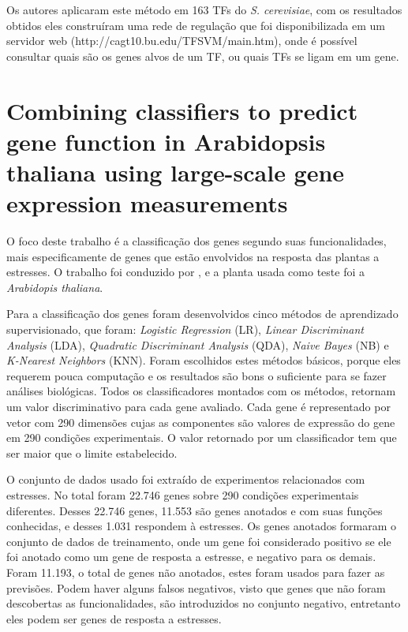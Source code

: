 Os autores aplicaram este método em 163 TFs do \textit{S. cerevisiae}, com os resultados obtidos eles construíram uma rede de regulação que foi disponibilizada em um servidor web (http://cagt10.bu.edu/TFSVM/main.htm), onde é possível consultar quais são os genes alvos de um TF, ou quais TFs se ligam em um gene.




\section{Combining classifiers to predict gene function in Arabidopsis thaliana using large-scale gene expression measurements \cite{Lan2007}}

O foco deste trabalho é a classificação dos genes segundo suas funcionalidades, mais especificamente de genes que estão envolvidos na resposta das plantas a estresses. O trabalho foi conduzido por \cite{Lan2007}, e a planta usada como teste foi a \textit{Arabidopis thaliana}.

Para a classificação dos genes foram desenvolvidos cinco métodos de aprendizado supervisionado, que foram: \textit{Logistic Regression} (LR), \textit{Linear Discriminant Analysis} (LDA), \textit{Quadratic Discriminant Analysis} (QDA), \textit{Naive Bayes} (NB) e \textit{K-Nearest Neighbors} (KNN). Foram escolhidos estes métodos básicos, porque eles requerem pouca computação e os resultados são bons o suficiente para se fazer análises biológicas. Todos os classificadores montados com os métodos, retornam um valor discriminativo para cada gene avaliado. Cada gene é representado por vetor com 290 dimensões cujas as componentes são valores de expressão do gene em 290 condições experimentais. O valor retornado por um classificador tem que ser maior que o limite estabelecido.

O conjunto de dados usado foi extraído de experimentos relacionados com estresses. No total foram 22.746 genes sobre 290 condições experimentais diferentes. Desses 22.746 genes, 11.553 são genes anotados e com suas funções conhecidas, e desses 1.031 respondem à estresses. Os genes anotados formaram o conjunto de dados de treinamento, onde um gene foi considerado positivo se ele foi anotado como um gene de resposta a estresse, e negativo para os demais. Foram 11.193, o total de genes não anotados, estes foram usados para fazer as previsões. Podem haver alguns falsos negativos, visto que genes que não foram descobertas as funcionalidades, são introduzidos no conjunto negativo, entretanto eles podem ser genes de resposta a estresses.


